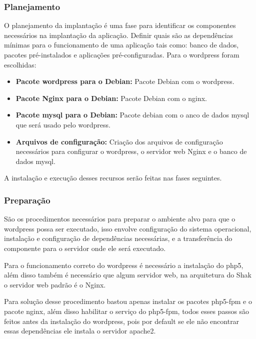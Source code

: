 \subsubsection{Planejamento}

O planejamento da implantação é uma fase para identificar os componentes
necessários na implantação da aplicação. Definir quais são as dependências mínimas
para o funcionamento de uma aplicação tais como: banco de dados, pacotes
pré-instalados e aplicações pré-configuradas. Para o wordpress foram escolhidas:

\begin{itemize}
   \item \textbf{Pacote wordpress para o Debian:} Pacote Debian com o wordpress.
   \item \textbf{Pacote Nginx para o Debian:} Pacote Debian com o nginx.
   \item \textbf{Pacote mysql para o Debian:} Pacote debian com o anco de dados mysql
   que será usado pelo wordpress.
   \item \textbf{Arquivos de configuração:} Criação dos arquivos de configuração
   necessários para configurar o wordpress, o servidor web Nginx e o banco de dados
   mysql.
\end{itemize}

A instalação e execução desses recursos serão feitas nas fases seguintes.

\subsubsection{Preparação}

São os procedimentos necessários para preparar o ambiente alvo para que o wordpress
possa ser executado, isso envolve configuração do sistema operacional, instalação
e configuração de dependências necessárias, e a transferência do componente
para o servidor onde ele será executado.

Para o funcionamento correto do wordpress é necessário a instalação do php5, além
disso também é necessário que algum servidor web, na arquitetura do Shak o servidor
web padrão é o Nginx.

Para solução desse procedimento bastou apenas instalar os pacotes php5-fpm e o
pacote nginx, além disso habilitar o serviço do php5-fpm, todos esses passos são
feitos antes da instalação do wordpress, pois por default se ele não encontrar
essas dependências ele instala o servidor apache2.


